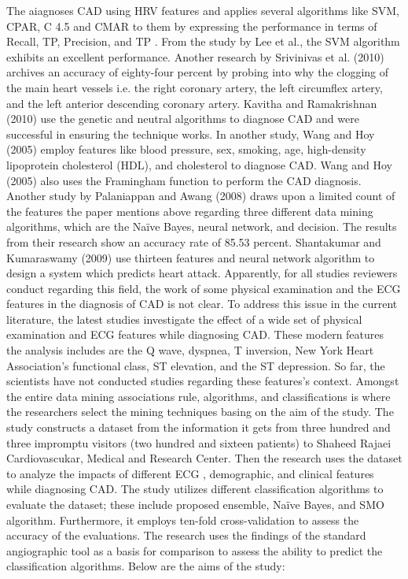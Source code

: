 \documentclass[sigconf]{acmart}
\begin{document}
 The aiagnoses CAD using HRV features and applies several algorithms like SVM, CPAR, C 4.5 and CMAR to them by expressing the performance in terms of Recall, TP, Precision, and TP \citep{ali}. From the study by Lee et al., the SVM algorithm exhibits an excellent performance. Another research by Srivinivas et al. (2010) archives an accuracy of eighty-four percent by probing into why the clogging of the main heart vessels i.e. the right coronary artery, the left circumflex artery, and the left anterior descending coronary artery.	Kavitha and Ramakrishnan (2010) use the genetic and neutral algorithms to diagnose CAD and were successful in ensuring the technique works. In another study, Wang and Hoy (2005) employ features like blood pressure, sex, smoking, age, high-density lipoprotein cholesterol (HDL), and cholesterol to diagnose CAD. Wang and Hoy (2005) also uses the Framingham function to perform the CAD diagnosis.  Another study by Palaniappan and Awang (2008) draws upon a limited count of the features the paper mentions above regarding three different data mining algorithms, which are the Naïve Bayes, neural network, and decision. The results from their research show an accuracy rate of 85.53 percent. Shantakumar and Kumaraswamy (2009) use thirteen features and neural network algorithm to design a system which predicts heart attack.	Apparently, for all studies reviewers conduct regarding this field, the work of some physical examination and the ECG features in the diagnosis of CAD is not clear.  To address this issue in the current literature, the latest studies investigate the effect of a wide set of physical examination and ECG features while diagnosing CAD. These modern features the analysis includes are the Q wave, dyspnea, T inversion, New York Heart Association’s functional class,  ST elevation, and the ST depression. So far, the scientists have not conducted studies regarding these features’s context. Amongst the entire data mining associations rule, algorithms, and classifications is where the researchers select the mining techniques basing on the aim of the study. The study constructs a dataset from the information it gets from three hundred and three impromptu visitors (two hundred and sixteen patients) to Shaheed Rajaei Cardiovascukar, Medical and Research Center. Then the research uses the dataset to analyze the impacts of different ECG , demographic, and clinical features while diagnosing  CAD. The study utilizes different classification algorithms to evaluate the dataset; these include proposed ensemble, Naïve Bayes, and SMO algorithm. Furthermore, it employs ten-fold cross-validation to assess the accuracy of the evaluations. The research uses the findings of the standard angiographic tool as a basis for comparison to assess the ability to predict the classification algorithms. Below are the aims of the study:
\end{document}
